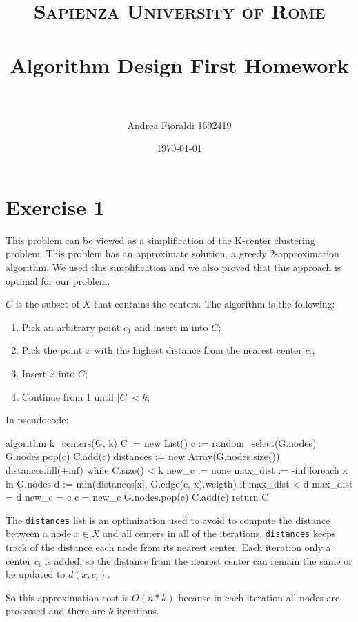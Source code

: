 \documentclass[paper=a4, fontsize=11pt]{scrartcl} %
\title{    
\normalfont \normalsize 
\textsc{Sapienza University of Rome} \\ [25pt] %
\horrule{0.5pt} \\[0.4cm] %
\huge Algorithm Design First Homework \\ %
\horrule{2pt} \\[0.5cm] %
}
\author{Andrea Fioraldi 1692419} %
\date{\normalsize\today} %
\numberwithin{equation}{section} %
\numberwithin{figure}{section} %
\numberwithin{table}{section} %
\begin{document}
\maketitle %

\section*{Exercise 1}

This problem can be viewed as a simplification of the K-center clustering problem. This problem has an approximate solution, a greedy 2-approximation algorithm. We used this simplification and we also proved that this approach is optimal for our problem.

$C$ is the subset of $X$ that contains the centers. The algorithm is the following:

\begin{enumerate}
    \item Pick an arbitrary point $c_1$ and insert in into $C$;
    \item Pick the point $x$ with the highest distance from the nearest center $c_i$;
    \item Insert $x$ into $C$;
    \item Continue from 1 until $|C| < k$;
\end{enumerate}

In pseudocode:

\begin{pseudo}
algorithm k_centers(G, k)
    C := new List()
    c := random_select(G.nodes)
    G.nodes.pop(c)
    C.add(c)
    distances := new Array(G.nodes.size())
    distances.fill(+inf)
    while C.size() < k
        new_c := none
        max_dist := -inf
        foreach x in G.nodes
            d := min(distances[x], G.edge(c, x).weigth)
            if max_dist < d
                max_dist = d
                new_c = c
        c = new_c
        G.nodes.pop(c)
        C.add(c)
    return C
\end{pseudo}


The \verb|distances| list is an optimization used to avoid to compute the distance between a node $x \in X$ and all centers in all of the iterations. \verb|distances| keeps track of the distance each node from its nearest center. Each iteration only a center $c_i$ is added, so the distance from the nearest center can remain the same or be updated to $d(x, c_i)$.

So this approximation cost is $O(n*k)$ because in each iteration all nodes are processed and there are $k$ iterations. 
\end{document}
